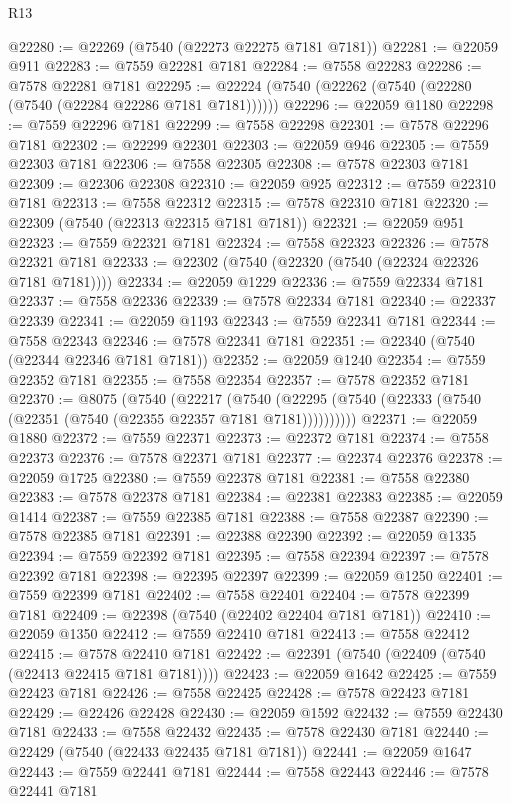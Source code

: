 \begin{lexlean}{R13}
\begin{coremodule}
@22280 := @22269 (@7540 (@22273 @22275 @7181 @7181))
@22281 := @22059 @911
@22283 := @7559 @22281 @7181
@22284 := @7558 @22283
@22286 := @7578 @22281 @7181
@22295 := @22224 (@7540 (@22262 (@7540 (@22280 (@7540 (@22284 @22286 @7181 @7181))))))
@22296 := @22059 @1180
@22298 := @7559 @22296 @7181
@22299 := @7558 @22298
@22301 := @7578 @22296 @7181
@22302 := @22299 @22301
@22303 := @22059 @946
@22305 := @7559 @22303 @7181
@22306 := @7558 @22305
@22308 := @7578 @22303 @7181
@22309 := @22306 @22308
@22310 := @22059 @925
@22312 := @7559 @22310 @7181
@22313 := @7558 @22312
@22315 := @7578 @22310 @7181
@22320 := @22309 (@7540 (@22313 @22315 @7181 @7181))
@22321 := @22059 @951
@22323 := @7559 @22321 @7181
@22324 := @7558 @22323
@22326 := @7578 @22321 @7181
@22333 := @22302 (@7540 (@22320 (@7540 (@22324 @22326 @7181 @7181))))
@22334 := @22059 @1229
@22336 := @7559 @22334 @7181
@22337 := @7558 @22336
@22339 := @7578 @22334 @7181
@22340 := @22337 @22339
@22341 := @22059 @1193
@22343 := @7559 @22341 @7181
@22344 := @7558 @22343
@22346 := @7578 @22341 @7181
@22351 := @22340 (@7540 (@22344 @22346 @7181 @7181))
@22352 := @22059 @1240
@22354 := @7559 @22352 @7181
@22355 := @7558 @22354
@22357 := @7578 @22352 @7181
@22370 := @8075
    (@7540
      (@22217
        (@7540 (@22295 (@7540 (@22333 (@7540 (@22351 (@7540 (@22355 @22357 @7181 @7181))))))))))
@22371 := @22059 @1880
@22372 := @7559 @22371
@22373 := @22372 @7181
@22374 := @7558 @22373
@22376 := @7578 @22371 @7181
@22377 := @22374 @22376
@22378 := @22059 @1725
@22380 := @7559 @22378 @7181
@22381 := @7558 @22380
@22383 := @7578 @22378 @7181
@22384 := @22381 @22383
@22385 := @22059 @1414
@22387 := @7559 @22385 @7181
@22388 := @7558 @22387
@22390 := @7578 @22385 @7181
@22391 := @22388 @22390
@22392 := @22059 @1335
@22394 := @7559 @22392 @7181
@22395 := @7558 @22394
@22397 := @7578 @22392 @7181
@22398 := @22395 @22397
@22399 := @22059 @1250
@22401 := @7559 @22399 @7181
@22402 := @7558 @22401
@22404 := @7578 @22399 @7181
@22409 := @22398 (@7540 (@22402 @22404 @7181 @7181))
@22410 := @22059 @1350
@22412 := @7559 @22410 @7181
@22413 := @7558 @22412
@22415 := @7578 @22410 @7181
@22422 := @22391 (@7540 (@22409 (@7540 (@22413 @22415 @7181 @7181))))
@22423 := @22059 @1642
@22425 := @7559 @22423 @7181
@22426 := @7558 @22425
@22428 := @7578 @22423 @7181
@22429 := @22426 @22428
@22430 := @22059 @1592
@22432 := @7559 @22430 @7181
@22433 := @7558 @22432
@22435 := @7578 @22430 @7181
@22440 := @22429 (@7540 (@22433 @22435 @7181 @7181))
@22441 := @22059 @1647
@22443 := @7559 @22441 @7181
@22444 := @7558 @22443
@22446 := @7578 @22441 @7181

\end{coremodule}
\end{lexlean}
